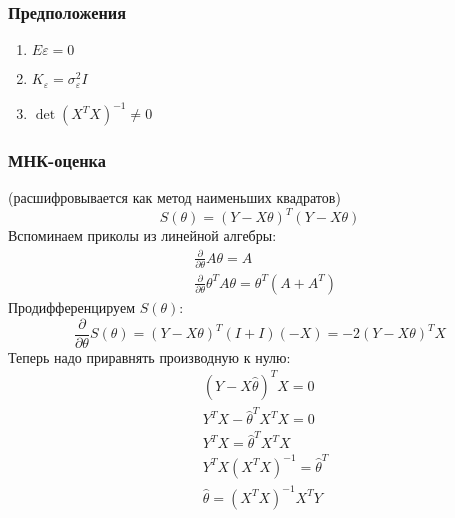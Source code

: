 \documentclass[12pt, a4paper]{article}
\begin{document}
\subsubsection*{Предположения}
\begin{enumerate}
    \item $E\varepsilon = 0$
    \item $K_{\varepsilon} = \sigma_{\varepsilon}^2 I$
    \item $\det \left( X^T X \right)^{-1} \neq 0$
\end{enumerate}
\subsubsection*{МНК-оценка}
(расшифровывается как метод наименьших квадратов)
\[
S(\theta) = (Y - X\theta)^T (Y - X\theta)
\]
Вспоминаем приколы из линейной алгебры:
\begin{equation*}
    \begin{aligned}
        &\frac{\partial}{\partial \theta} A \theta = A\\
        &\frac{\partial}{\partial \theta} \theta^T A \theta = \theta^T(A + A^T)
    \end{aligned}
\end{equation*}
Продифференцируем $S(\theta)$:
\[
\frac{\partial}{\partial \theta} S(\theta) = (Y - X\theta)^T (I + I) (-X) = -2(Y - X\theta)^T X
\]
Теперь надо приравнять производную к нулю:
\begin{equation*}
    \begin{aligned}
        & \left( Y - X\hat \theta \right)^T X = 0\\
        & Y^T X - \hat \theta^T X^T X = 0\\
        & Y^T X = \hat \theta^T X^T X\\
        & Y^T X {\left(X^T X\right)}^{-1} = \hat \theta^T\\
        & \hat \theta = {\left(X^T X\right)}^{-1} X^T Y
    \end{aligned}
\end{equation*}
\end{document}
